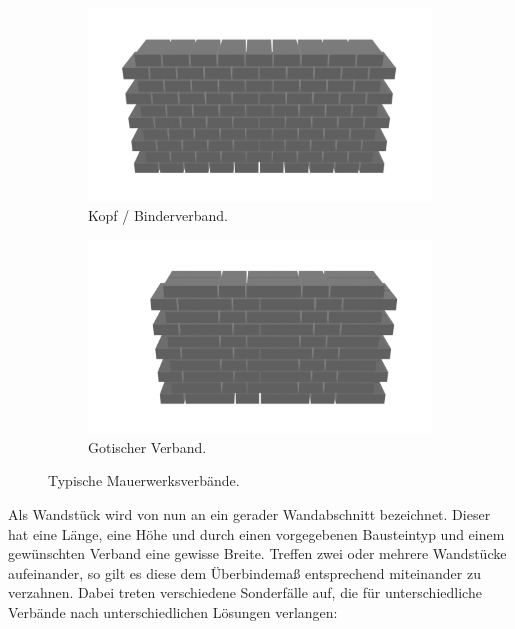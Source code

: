 \begin{figure}[htb]
  \begin{subfigure}[b]{0.49\columnwidth}
    \includegraphics[width=\columnwidth]{fig/kopfverband.png}
    \caption{Kopf / Binderverband.}\label{fig:basics:binderverband}
  \end{subfigure}
  \begin{subfigure}[b]{0.49\columnwidth}
    \includegraphics[width=\columnwidth]{fig/gotischerverband.png}
    \caption{Gotischer Verband.}\label{fig:basics:gotischer_verband}
  \end{subfigure}
  \caption{Typische Mauerwerksverbände.}\label{fig:basics:verbaende}
\end{figure}
Als Wandstück wird von nun an ein gerader Wandabschnitt bezeichnet.
Dieser hat eine Länge, eine Höhe und durch einen vorgegebenen Bausteintyp und einem gewünschten Verband eine gewisse Breite.
Treffen zwei oder mehrere Wandstücke aufeinander, so gilt es diese dem Überbindemaß entsprechend miteinander zu verzahnen.
Dabei treten verschiedene Sonderfälle auf, die für unterschiedliche Verbände nach unterschiedlichen Lösungen verlangen:
